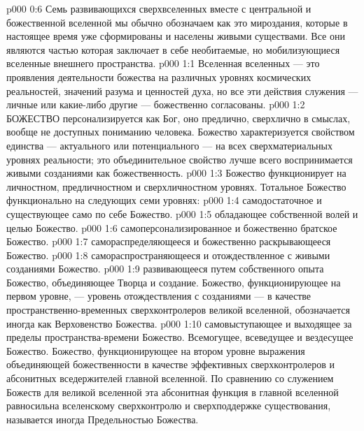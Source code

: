 \vs p000 0:6 Семь развивающихся сверхвселенных вместе с центральной и божественной вселенной мы обычно обозначаем как  это мироздания, которые в настоящее время уже сформированы и населены живыми существами. Все они являются частью  которая заключает в себе необитаемые, но мобилизующиеся вселенные внешнего пространства.
\vs p000 1:1 Вселенная вселенных --- это проявления деятельности божества на различных уровнях космических реальностей, значений разума и ценностей духа, но все эти действия служения --- личные или какие\hyp{}либо другие --- божественно согласованы.
\vs p000 1:2 \pc БОЖЕСТВО персонализируется как Бог, оно предлично, сверхлично в смыслах, вообще не доступных пониманию человека. Божество характеризуется свойством единства --- актуального или потенциального --- на всех сверхматериальных уровнях реальности; это объединительное свойство лучше всего воспринимается живыми созданиями как божественность.
\vs p000 1:3 \pc Божество функционирует на личностном, предличностном и сверхличностном уровнях. Тотальное Божество функционально на следующих семи уровнях:
\vs p000 1:4 \bibnobreakspace {} самодостаточное и существующее само по себе Божество.
\vs p000 1:5 \bibnobreakspace {} обладающее собственной волей и целью Божество.
\vs p000 1:6 \bibnobreakspace {} самоперсонализированное и божественно братское Божество.
\vs p000 1:7 \bibnobreakspace {} самораспределяющееся и божественно раскрывающееся Божество.
\vs p000 1:8 \bibnobreakspace {} самораспространяющееся и отождествленное с живыми созданиями Божество.
\vs p000 1:9 \bibnobreakspace {} развивающееся путем собственного опыта Божество, объединяющее Творца и создание. Божество, функционирующее на первом уровне, --- уровень отождествления с созданиями --- в качестве пространственно\hyp{}временных сверхконтролеров великой вселенной, обозначается иногда как Верховенство Божества.
\vs p000 1:10 \bibnobreakspace {} самовыступающее и выходящее за пределы пространства\hyp{}времени Божество. Всемогущее, всеведущее и вездесущее Божество. Божество, функционирующее на втором уровне выражения объединяющей божественности в качестве эффективных сверхконтролеров и абсонитных вседержителей главной вселенной. По сравнению со служением Божеств для великой вселенной эта абсонитная функция в главной вселенной равносильна вселенскому сверхконтролю и сверхподдержке существования, называется иногда Предельностью Божества.
